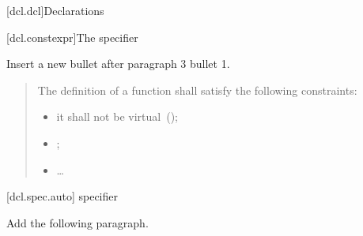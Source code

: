 
\setcounter{chapter}{6}
[dcl.dcl]{Declarations}

\setcounter{section}{1}
\setcounter{subsection}{4}
[dcl.constexpr]{The  specifier}%

Insert a new bullet after paragraph 3 bullet 1.


\begin{quote}
  \setcounter{Paras}{2}
\pnum
{}
The definition of a  function shall satisfy the following
constraints:

\begin{itemize}
  \item it shall not be virtual~();
  \item {};
  \item \ldots
\end{itemize}
\end{quote}

%
%  
%      

\setcounter{section}{1}
\setcounter{subsection}{6}
\setcounter{subsubsection}{3}
[dcl.spec.auto]{ specifier}

Add the following paragraph.

